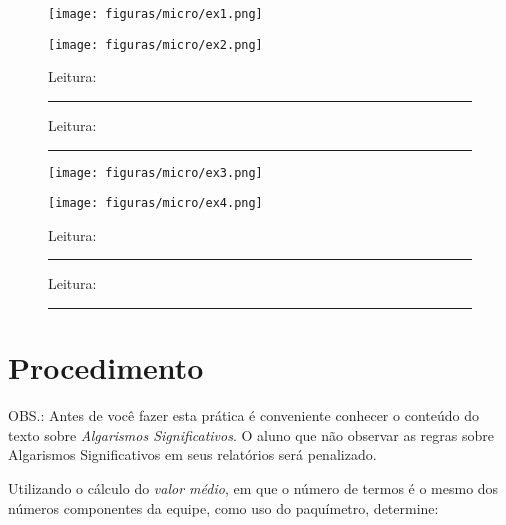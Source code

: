 \documentclass[10pt,a4paper,onecolumn,notitlepage]{scrartcl}
\begin{document}
\begin{figure}[H]
\label{fig:prelab}
\centering
\begin{minipage}{\linewidth}
\begin{minipage}{0.5\linewidth}
\texttt{[image: figuras/micro/ex1.png]} 
\end{minipage}
\begin{minipage}{0.5\linewidth}
\texttt{[image: figuras/micro/ex2.png]} 
\end{minipage}
\begin{minipage}{0.4\linewidth}
\vspace{0.5cm}
Leitura:\rule{3cm}{0.4pt}
\vspace{1cm}
\end{minipage}
\begin{minipage}{0.4\linewidth}
\vspace{0.5cm}
Leitura:\rule{3cm}{0.4pt}
\vspace{1cm}
\end{minipage}
\begin{minipage}{0.5\linewidth}
\texttt{[image: figuras/micro/ex3.png]} 
\end{minipage}
\begin{minipage}{0.5\linewidth}
\texttt{[image: figuras/micro/ex4.png]} 
\end{minipage}
\begin{minipage}{0.5\linewidth}
\vspace{0.5cm}
Leitura:\rule{3cm}{0.4pt}
\vspace{1cm}
\end{minipage}
\begin{minipage}{0.5\linewidth}
\vspace{0.5cm}
Leitura:\rule{3cm}{0.4pt}
\vspace{1cm}
\end{minipage}
\end{minipage}
\end{figure}


\section{Procedimento}
OBS.: Antes de você fazer esta prática é conveniente conhecer o conteúdo do texto sobre \emph{Algarismos Significativos}. O aluno que não observar as regras sobre Algarismos Significativos em seus relatórios será penalizado.

Utilizando o cálculo do \emph{valor médio}, em que o número de termos  é o mesmo dos números componentes da equipe, como uso do paquímetro, determine:
\end{document}
